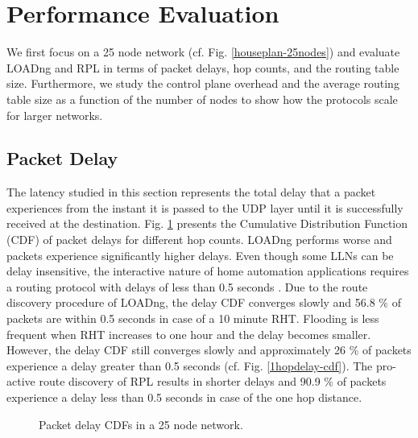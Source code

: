 \documentclass[conference,10pt,a4paper]{IEEEtran}
\begin{document}
\section{Performance Evaluation}
\label{performance}

We first focus on a 25 node network (cf. Fig. \ref{houseplan-25nodes}) and
evaluate LOADng and RPL in terms of packet delays, hop counts, and the
routing table size. Furthermore, we study the control plane overhead and the
average routing table size as a function of the number of nodes to show how the
protocols scale for larger
networks.


\vspace{-0.2cm}\subsection{Packet Delay}
\label{delay}

The latency studied in this section represents the total delay that a packet
experiences from the instant it is passed to the UDP layer until it is
successfully received at the destination. Fig. \ref{fig:hop-delays} presents the
Cumulative Distribution Function (CDF) of packet delays for different hop
counts. 
LOADng performs worse and
packets experience significantly higher delays. Even though some LLNs can be
delay insensitive, the interactive nature of home automation applications
requires a routing protocol with delays of less than 0.5 seconds
\cite{routingreq-home}. Due to the route discovery procedure of LOADng, the
delay CDF converges slowly and 56.8 \% of packets are within 0.5
seconds in case of a 10 minute RHT. Flooding is less frequent when
RHT increases to one hour and the delay  becomes
smaller. However, the delay CDF still converges slowly and approximately 26 \% of
packets experience a delay greater than 0.5 seconds
(cf. Fig. \ref{1hopdelay-cdf}). The pro-active route discovery of RPL results in
shorter delays and 90.9 \% of packets experience a delay less than 0.5 seconds
in case of the one hop distance.


\begin{figure}[htbp]
\centering
{}
\caption{Packet delay CDFs in a 25 node network.}
\label{fig:hop-delays}
\end{figure}
\end{document}
